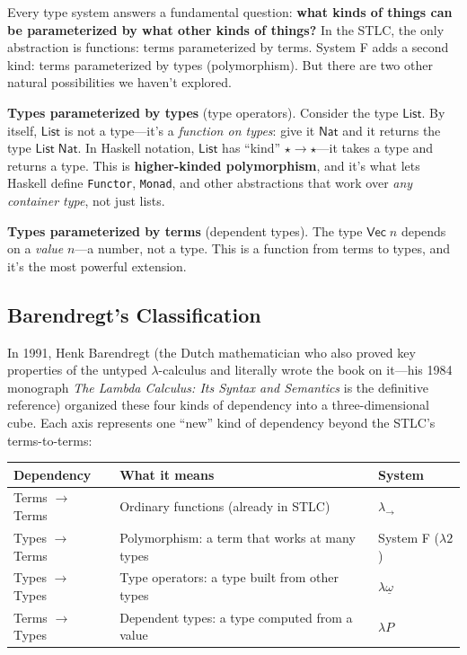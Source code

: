 \documentclass[11pt,a4paper]{article}
\theoremstyle{definition}
\newcommand{\lam}{\lambda}
\begin{document}
Every type system answers a fundamental question: \textbf{what kinds of things
can be parameterized by what other kinds of things?} In the STLC, the only
abstraction is functions: terms parameterized by terms. System F adds a second
kind: terms parameterized by types (polymorphism). But there are two other
natural possibilities we haven't explored.

\textbf{Types parameterized by types} (type operators). Consider the type
$\textsf{List}$. By itself, $\textsf{List}$ is not a type---it's a
\emph{function on types}: give it $\textsf{Nat}$ and it returns the type
$\textsf{List}\;\textsf{Nat}$. In Haskell notation, $\textsf{List}$ has
``kind'' $\star \to \star$---it takes a type and returns a type. This is
\textbf{higher-kinded polymorphism}, and it's what lets Haskell define
\texttt{Functor}, \texttt{Monad}, and other abstractions that work over
\emph{any container type}, not just lists.

\textbf{Types parameterized by terms} (dependent types). The type
$\textsf{Vec}\;n$ depends on a \emph{value} $n$---a number, not a type. This
is a function from terms to types, and it's the most powerful extension.

\subsection{Barendregt's Classification}

In 1991, Henk Barendregt (the Dutch mathematician who also proved key properties
of the untyped $\lam$-calculus and literally wrote the book on it---his 1984
monograph \emph{The Lambda Calculus: Its Syntax and Semantics} is the definitive
reference) organized these four kinds of dependency into a three-dimensional
cube. Each axis represents one ``new'' kind of dependency beyond the
STLC's terms-to-terms:

\begin{center}
\renewcommand{\arraystretch}{1.6}
\begin{tabular}{lp{7cm}l}
\textbf{Dependency} & \textbf{What it means} & \textbf{System} \\
\hline
Terms $\to$ Terms & Ordinary functions (already in STLC) & $\lam_\to$ \\
Types $\to$ Terms & Polymorphism: a term that works at many types & System F ($\lam 2$) \\
Types $\to$ Types & Type operators: a type built from other types & $\lam\underline\omega$ \\
Terms $\to$ Types & Dependent types: a type computed from a value & $\lam P$ \\
\end{tabular}
\end{center}
\end{document}
